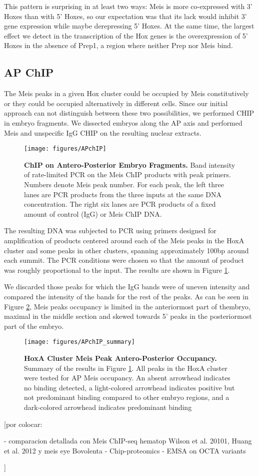 This pattern is surprising in at least two ways: Meis is more co-expressed with 3' Hoxes than with 5' Hoxes, so our expectation was that its lack would inhibit 3' gene expression while maybe derepressing 5' Hoxes. At the same time, the largest effect we detect in the transcription of the Hox genes is the overexpression of 5' Hoxes in the absence of Prep1, a region where neither Prep nor Meis bind.

\subsection{AP ChIP}

The Meis peaks in a given Hox cluster could be occupied by Meis constitutively or they could be occupied alternatively in different cells. Since our initial approach can not distinguish between these two possibilities, we performed \ac{CHIP} in embryo fragments. We dissected embryos along the \ac{AP} axis and performed Meis and unspecific IgG \ac{CHIP} on the resulting nuclear extracts.

\begin{figure}[p]
  \centering
  \texttt{[image: figures/APchIP]}
  \caption[ChIP on Antero-Posterior Embryo Fragments]{\textbf{ChIP on Antero-Posterior Embryo Fragments.} Band intensity of rate-limited PCR on the Meis ChIP products with peak primers. Numbers denote Meis peak number. For each peak, the left three lanes are PCR products from the three inputs at the same DNA concentration. The right six lanes are PCR products of a fixed amount of control (IgG) or Meis ChIP DNA.}
  \label{fig:APchip}
\end{figure}

The resulting DNA was subjected to \ac{PCR} using primers designed for amplification of products centered around each of the Meis peaks in the HoxA cluster and some peaks in other clusters, spanning approximately 100bp around each summit. The PCR conditions were chosen so that the amount of product was roughly proportional to the input. The results are shown in Figure \ref{fig:APchip}. 

We discarded those peaks for which the IgG bands were of uneven intensity and compared the intensity of the bands for the rest of the peaks. As can be seen in Figure \ref{fig:APchipSummary}, Meis peaks occupancy is limited in the anteriormost part of thembryo, maximal in the middle section and skewed towards 5' peaks in the posteriormost part of the embryo.

\begin{figure}[]
  \centering
  \texttt{[image: figures/APchIP\_summary]}
  \caption[HoxA Cluster Meis Peak Antero-Posterior Occupancy]{\textbf{HoxA Cluster Meis Peak Antero-Posterior Occupancy.} Summary of the results in Figure \ref{fig:APchip}. All peaks in the HoxA cluster were tested for AP Meis occupancy. An absent arrowhead indicates no binding detected, a light-colored arrowhead indicates positive but not predominant binding compared to other embryo regions, and a dark-colored arrowhead indicates predominant binding}
  \label{fig:APchipSummary}
\end{figure}

[por colocar:

- comparacion detallada con Meis ChIP-seq hematop {Wilson et al. 20101, Huang et al. 2012} y meis eye {Bovolenta}
- Chip-proteomics
- EMSA on OCTA variants

]
